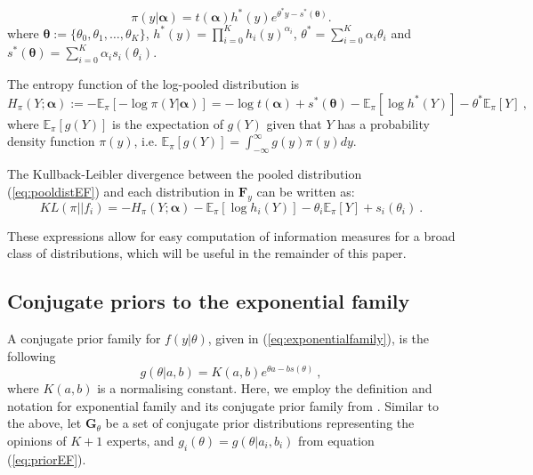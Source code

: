\documentclass[a4paper, notitlepage, 10pt]{article}
\begin{document}
\begin{equation}
\label{eq:pooldistEF}
\pi(y| \boldsymbol\alpha ) = t(\boldsymbol\alpha) h^\ast (y) e^{\theta^\ast y - s^\ast (\boldsymbol\theta)}.
\end{equation}
where $\boldsymbol\theta :=\{\theta_0, \theta_1, \ldots, \theta_K \}$, $h^\ast (y) = \prod_{i = 0}^K h_i(y)^{\alpha_i}$,  $\theta^\ast = \sum_{i = 0}^K \alpha_i \theta_i$ and $s^\ast (\boldsymbol\theta) = \sum_{i = 0}^K \alpha_i s_i(\theta_i)$.

The entropy function of the log-pooled distribution is
\begin{equation}
\label{eq:entropydistEF}
H_\pi(Y; \boldsymbol\alpha) :=  - \mathbb{E}_{\pi}\left[-\log \pi(Y | \boldsymbol\alpha) \right] = -\log t(\boldsymbol\alpha) + s^\ast (\boldsymbol\theta) - \mathbb{E}_\pi[\log h^\ast (Y)] - \theta^\ast \mathbb{E}_\pi[Y] \: ,
\end{equation}
where $\mathbb{E}_{\pi}\left[ g(Y) \right]$ is the expectation of $g(Y)$ given that $Y$ has a probability density function $\pi(y)$, i.e. $\mathbb{E}_{\pi}\left[ g(Y) \right] = \int_{-\infty}^{\infty} g(y) \pi(y) dy$. 

The Kullback-Leibler divergence between the pooled distribution (\ref{eq:pooldistEF}) and each distribution in $\mathbf{F}_{y}$ can be written as:
\begin{equation}
\label{eq:KLdistEF}
KL(\pi || f_i )  =  - H_\pi(Y; \boldsymbol\alpha) - \mathbb{E}_\pi[\log h_i(Y)] - \theta_i \mathbb{E}_\pi[Y] + s_i(\theta_i) \: .
\end{equation}

These expressions allow for easy computation of information measures for a broad class of distributions, which will be useful in the remainder of this paper.

\subsection{Conjugate priors to the exponential family}
\label{sec:conjugexpofamily}

A conjugate prior family for $f(y|\theta)$, given in (\ref{eq:exponentialfamily}), is the following
\begin{equation}
\label{eq:priorEF}
g(\theta | a, b) = K(a,b) e^{\theta a - b s(\theta)} \: ,
\end{equation}
where $K(a,b)$ is a normalising constant.
Here, we employ the definition and notation for exponential family and its conjugate prior family from \citet[chapter 3]{robert2001}. %
Similar to the above, let $\mathbf{G}_{\theta}$ be a set of conjugate prior distributions representing the opinions of $K+1$ experts, and $g_i(\theta) = g(\theta | a_i, b_i)$ from equation (\ref{eq:priorEF}).
\end{document}
